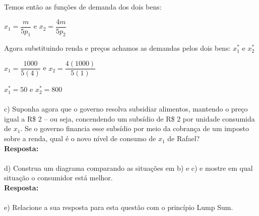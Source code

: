 \begin{enumerate}
\begin{center}
Temos então as funções de demanda dos dois bens:\\
\end{center}

\begin{center}
{$x_{1} = \dfrac{m}{5p_{1}}$} e {$x_{2} = \dfrac{4m}{5p_{2}}$}
\end{center}

\begin{center}
Agora substituindo renda e preços achamos as demandas pelos dois bens: {$x_{1}^{*}$} e {$x_{2}^{*}$}\\
\end{center}

\begin{center}
{$x_{1} = \dfrac{1000}{5(4)}$} e {$x_{2} = \dfrac{4(1000)}{5(1)}$}\\
\end{center}

\begin{center}
{$x_{1}^{*} = 50$} e {$x_{2}^{*} = 800$}
\end{center}



\paragraph{} c) Suponha agora que o governo resolva subsidiar alimentos, mantendo o preço igual a R\$ 2
– ou seja, concendendo um subsídio de R\$ 2 por unidade consumida de {$x_1$}. Se o governo
financia esse subsídio por meio da cobrança de um imposto sobre a renda, qual é o novo nível de consumo de {$x_1$} de Rafael?\\

\textbf{Resposta:}\\

\paragraph{} d) Construa um diagrama comparando as situações em b) e c) e mostre em qual situação o consumidor está melhor.\\

\textbf{Resposta:}\\

\paragraph{} e) Relacione a sua resposta para esta questão com o princípio Lump Sum.\\


\end{enumerate}
